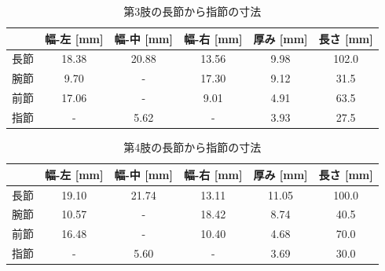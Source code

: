 %
\begin{table}[htbp]
  \centering
  \caption{第3肢の長節から指節の寸法}
  \label{tab:3setu}
  \vspace{-3mm}
  \begin{tabular}{|l|c|c|c|c|c|}
  \hline
     & \multicolumn{1}{l|}{幅-左 [mm]} & \multicolumn{1}{l|}{幅-中 [mm]} & \multicolumn{1}{l|}{幅-右 [mm]} & \multicolumn{1}{l|}{厚み [mm]} & \multicolumn{1}{l|}{長さ [mm]} \\ \hline
  長節 & 18.38                       & 20.88                       & 13.56                       & 9.98                        & 102.0                       \\ \hline
  腕節 & 9.70                        & -                           & 17.30                       & 9.12                        & 31.5                        \\ \hline
  前節 & 17.06                       & -                           & 9.01                        & 4.91                        & 63.5                        \\ \hline
  指節 & -                           & 5.62                        & -                           & 3.93                        & 27.5                        \\ \hline
  \end{tabular}
\end{table}
%
\begin{table}[htbp]
  \centering
  \caption{第4肢の長節から指節の寸法}
  \label{tab:4setu}
  \vspace{-3mm}
  \begin{tabular}{|l|c|c|c|c|c|}
  \hline
     & \multicolumn{1}{l|}{幅-左 [mm]} & \multicolumn{1}{l|}{幅-中 [mm]} & \multicolumn{1}{l|}{幅-右 [mm]} & \multicolumn{1}{l|}{厚み [mm]} & \multicolumn{1}{l|}{長さ [mm]} \\ \hline
  長節 & 19.10                       & 21.74                       & 13.11                       & 11.05                       & 100.0                       \\ \hline
  腕節 & 10.57                       & -                           & 18.42                       & 8.74                        & 40.5                        \\ \hline
  前節 & 16.48                       & -                           & 10.40                       & 4.68                        & 70.0                        \\ \hline
  指節 & -                           & 5.60                        & -                           & 3.69                        & 30.0                        \\ \hline
  \end{tabular}
  \end{table}
